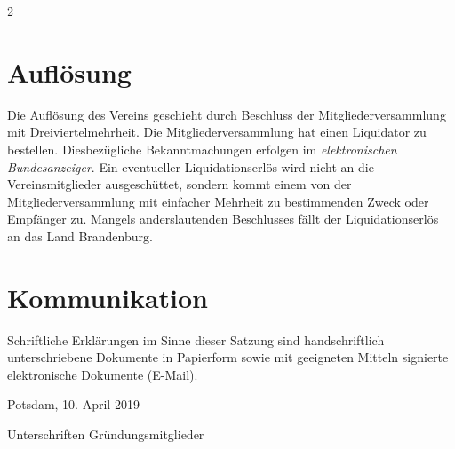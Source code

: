 \documentclass[a4paper, 10pt, headings=normal]{scrartcl}
\newenvironment{textinput}[1]%
{%
	\par%
	\vspace{0.75mm}%
	\noindent%
	\linespread{1}%
	\begin{tcolorbox}[colback=light-gray, sharp corners=all, boxrule=0pt, colframe=light-gray, left=1mm, top=0.3mm, bottom=-0.3mm, right=1mm, width=#1]
		\begin{minipage}[t]{\linewidth}%
			\textinputfont\strut%
}%
{%
			\strut%
		\end{minipage}%
	\end{tcolorbox}
	\vspace{0.75mm}%
}
\begin{document}
\begin{multicols}{2}
\section{Auflösung}
\label{par:aufloseung}

Die Auflösung des Vereins geschieht durch Beschluss der Mitgliederversammlung mit Dreiviertelmehrheit.
Die Mitgliederversammlung hat einen Liquidator zu bestellen.
Diesbezügliche Bekanntmachungen erfolgen im \emph{elektronischen Bundesanzeiger}.
Ein eventueller Liquidationserlös wird nicht an die Vereinsmitglieder ausgeschüttet, sondern kommt einem von der Mitgliederversammlung mit einfacher Mehrheit zu bestimmenden Zweck oder Empfänger zu.
Mangels anderslautenden Beschlusses fällt der Liquidationserlös an das Land Brandenburg.

\section{Kommunikation}
\label{par:kommunikation}

Schriftliche Erklärungen im Sinne dieser Satzung sind handschriftlich unterschriebene Dokumente in Papierform sowie mit geeigneten Mitteln signierte elektronische Dokumente (E-Mail).

\end{multicols}

\bigskip

\noindent Potsdam, 10. April 2019

\bigskip

\begin{textinput}{\linewidth}%
	Unterschriften Gründungsmitglieder
	\vspace{100mm}%
\end{textinput}%
\end{document}
